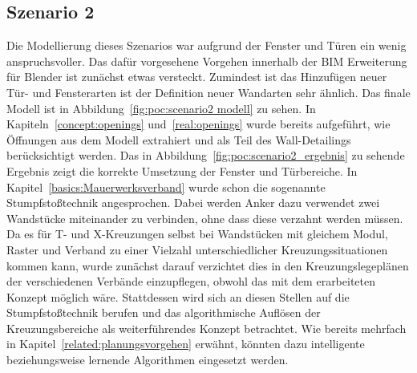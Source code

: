 \subsection{Szenario 2}\label{poc:scenario2}
Die Modellierung dieses Szenarios war aufgrund der Fenster und Türen ein wenig anspruchsvoller.
Das dafür vorgesehene Vorgehen innerhalb der BIM Erweiterung für Blender ist zunächst etwas versteckt.
Zumindest ist das Hinzufügen neuer Tür- und Fensterarten ist der Definition neuer Wandarten sehr ähnlich.
Das finale Modell ist in Abbildung~\ref{fig:poc:scenario2 modell} zu sehen.
In Kapiteln~\ref{concept:openings} und~\ref{real:openings} wurde bereits aufgeführt, wie Öffnungen aus dem Modell extrahiert und als Teil des Wall-Detailings berücksichtigt werden.
Das in Abbildung~\ref{fig:poc:scenario2_ergebnis} zu sehende Ergebnis zeigt die korrekte Umsetzung der Fenster und Türbereiche.
In Kapitel~\ref{basics:Mauerwerksverband} wurde schon die sogenannte \glqq{}Stumpfstoßtechnik\grqq{} angesprochen.
Dabei werden Anker dazu verwendet zwei Wandstücke miteinander zu verbinden, ohne dass diese verzahnt werden müssen.
Da es für T- und X-Kreuzungen selbst bei Wandstücken mit gleichem Modul, Raster und Verband zu einer Vielzahl unterschiedlicher Kreuzungssituationen kommen kann, wurde zunächst darauf verzichtet dies in den Kreuzungslegeplänen der verschiedenen Verbände einzupflegen, obwohl das mit dem erarbeiteten Konzept möglich wäre.
Stattdessen wird sich an diesen Stellen auf die Stumpfstoßtechnik berufen und das algorithmische Auflösen der Kreuzungsbereiche als weiterführendes Konzept betrachtet.
Wie bereits mehrfach in Kapitel~\ref{related:planungsvorgehen} erwähnt, könnten dazu \glqq{}intelligente\grqq{} beziehungsweise lernende Algorithmen eingesetzt werden.

